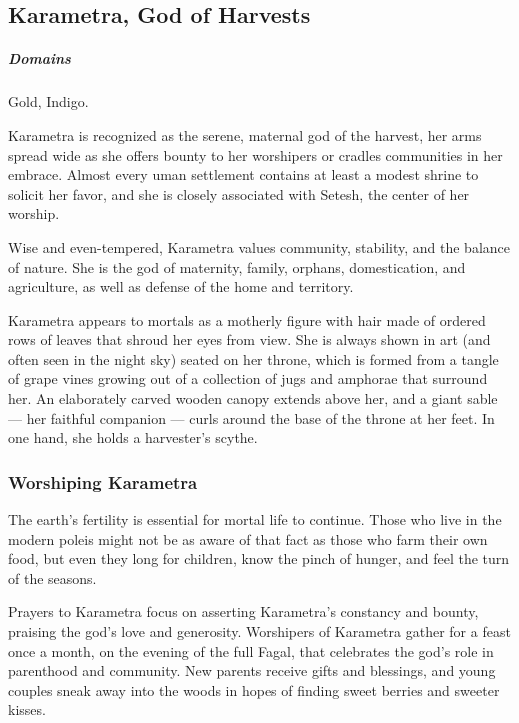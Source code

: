\subsection*{Karametra, God of Harvests} \label{ssec::karametra}
    \subparagraph{Domains} Gold, Indigo.

    Karametra is recognized as the serene, maternal god of the harvest, her arms spread wide as she offers bounty to her worshipers or cradles communities in her embrace.
    Almost every uman settlement contains at least a modest shrine to solicit her favor, and she is closely associated with Setesh, the center of her worship.

    Wise and even-tempered, Karametra values community, stability, and the balance of nature.
    She is the god of maternity, family, orphans, domestication, and agriculture, as well as defense of the home and territory.

    Karametra appears to mortals as a motherly figure with hair made of ordered rows of leaves that shroud her eyes from view.
    She is always shown in art (and often seen in the night sky) seated on her throne, which is formed from a tangle of grape vines growing out of a collection of jugs and amphorae that surround her.
    An elaborately carved wooden canopy extends above her, and a giant sable --- her faithful companion --- curls around the base of the throne at her feet.
    In one hand, she holds a harvester's scythe.


    \subsubsection{Worshiping Karametra}
        The earth's fertility is essential for mortal life to continue.
        Those who live in the modern poleis might not be as aware of that fact as those who farm their own food, but even they long for children, know the pinch of hunger, and feel the turn of the seasons.

        Prayers to Karametra focus on asserting Karametra's constancy and bounty, praising the god's love and generosity.
        Worshipers of Karametra gather for a feast once a month, on the evening of the full Fagal, that celebrates the god's role in parenthood and community.
        New parents receive gifts and blessings, and young couples sneak away into the woods in hopes of finding sweet berries and sweeter kisses.
